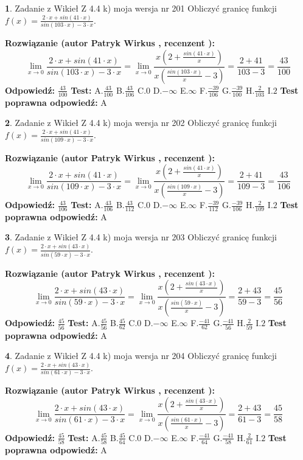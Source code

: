 \documentclass[12pt, a4paper]{article}
\theoremstyle{definition} %
\newtheorem{zad}{}
\newcommand{\zadStart}[1]{\begin{zad}#1\newline}
\newcommand{\zadStop}{\end{zad}}
\newcommand{\rozwStart}[2]{\noindent \textbf{Rozwiązanie (autor #1 , recenzent #2): }\newline}
\newcommand{\rozwStop}{\newline}
\newcommand{\odpStart}{\noindent \textbf{Odpowiedź:}\newline}
\newcommand{\odpStop}{\newline}
\newcommand{\testStart}{\noindent \textbf{Test:}\newline}
\newcommand{\testStop}{\newline}
\newcommand{\kluczStart}{\noindent \textbf{Test poprawna odpowiedź:}\newline}
\newcommand{\kluczStop}{\newline}
\begin{document}
\zadStart{Zadanie z Wikieł Z 4.4 k) moja wersja nr 201}
Obliczyć granicę funkcji $f(x)=\frac{2\cdot x +sin(41\cdot x)}{sin(103\cdot x) -3\cdot x}$.
\zadStop
\rozwStart{Patryk Wirkus}{}
$$\lim\limits_{x\to 0}\frac{2\cdot x +sin(41\cdot x)}{sin(103\cdot x) -3\cdot x}
=\lim\limits_{x\to 0}\frac{x(2+\frac{sin(41\cdot x)}{x})}{x(\frac{sin(103\cdot x)}{x}-3)}
=\frac{2+41}{103-3} = \frac{43}{100}$$
\rozwStop
\odpStart
$\frac{43}{100}$
\odpStop
\testStart
A.$\frac{43}{100}$
B.$\frac{43}{106}$
C.$0$
D.$-\infty$
E.$\infty$
F.$\frac{-39}{106}$
G.$\frac{-39}{100}$
H.$\frac{2}{103}$
I.$2$
\testStop
\kluczStart
A
\kluczStop



\zadStart{Zadanie z Wikieł Z 4.4 k) moja wersja nr 202}
Obliczyć granicę funkcji $f(x)=\frac{2\cdot x +sin(41\cdot x)}{sin(109\cdot x) -3\cdot x}$.
\zadStop
\rozwStart{Patryk Wirkus}{}
$$\lim\limits_{x\to 0}\frac{2\cdot x +sin(41\cdot x)}{sin(109\cdot x) -3\cdot x}
=\lim\limits_{x\to 0}\frac{x(2+\frac{sin(41\cdot x)}{x})}{x(\frac{sin(109\cdot x)}{x}-3)}
=\frac{2+41}{109-3} = \frac{43}{106}$$
\rozwStop
\odpStart
$\frac{43}{106}$
\odpStop
\testStart
A.$\frac{43}{106}$
B.$\frac{43}{112}$
C.$0$
D.$-\infty$
E.$\infty$
F.$\frac{-39}{112}$
G.$\frac{-39}{106}$
H.$\frac{2}{109}$
I.$2$
\testStop
\kluczStart
A
\kluczStop



\zadStart{Zadanie z Wikieł Z 4.4 k) moja wersja nr 203}
Obliczyć granicę funkcji $f(x)=\frac{2\cdot x +sin(43\cdot x)}{sin(59\cdot x) -3\cdot x}$.
\zadStop
\rozwStart{Patryk Wirkus}{}
$$\lim\limits_{x\to 0}\frac{2\cdot x +sin(43\cdot x)}{sin(59\cdot x) -3\cdot x}
=\lim\limits_{x\to 0}\frac{x(2+\frac{sin(43\cdot x)}{x})}{x(\frac{sin(59\cdot x)}{x}-3)}
=\frac{2+43}{59-3} = \frac{45}{56}$$
\rozwStop
\odpStart
$\frac{45}{56}$
\odpStop
\testStart
A.$\frac{45}{56}$
B.$\frac{45}{62}$
C.$0$
D.$-\infty$
E.$\infty$
F.$\frac{-41}{62}$
G.$\frac{-41}{56}$
H.$\frac{2}{59}$
I.$2$
\testStop
\kluczStart
A
\kluczStop



\zadStart{Zadanie z Wikieł Z 4.4 k) moja wersja nr 204}
Obliczyć granicę funkcji $f(x)=\frac{2\cdot x +sin(43\cdot x)}{sin(61\cdot x) -3\cdot x}$.
\zadStop
\rozwStart{Patryk Wirkus}{}
$$\lim\limits_{x\to 0}\frac{2\cdot x +sin(43\cdot x)}{sin(61\cdot x) -3\cdot x}
=\lim\limits_{x\to 0}\frac{x(2+\frac{sin(43\cdot x)}{x})}{x(\frac{sin(61\cdot x)}{x}-3)}
=\frac{2+43}{61-3} = \frac{45}{58}$$
\rozwStop
\odpStart
$\frac{45}{58}$
\odpStop
\testStart
A.$\frac{45}{58}$
B.$\frac{45}{64}$
C.$0$
D.$-\infty$
E.$\infty$
F.$\frac{-41}{64}$
G.$\frac{-41}{58}$
H.$\frac{2}{61}$
I.$2$
\testStop
\kluczStart
A
\kluczStop
\end{document}
